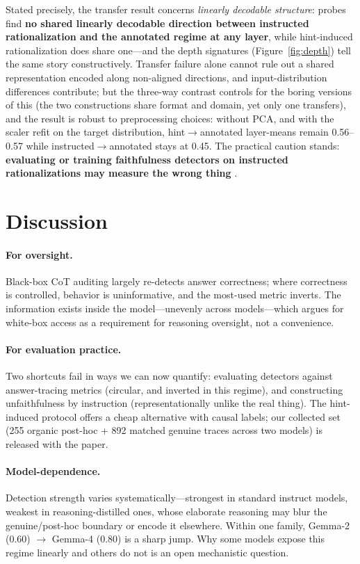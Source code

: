 \documentclass[11pt]{article}
\begin{document}
Stated precisely, the transfer result concerns \emph{linearly decodable structure}: probes find \textbf{no shared linearly decodable direction between instructed rationalization and the annotated regime at any layer}, while hint-induced rationalization does share one---and the depth signatures (Figure~\ref{fig:depth}) tell the same story constructively. Transfer failure alone cannot rule out a shared representation encoded along non-aligned directions, and input-distribution differences contribute; but the three-way contrast controls for the boring versions of this (the two constructions share format and domain, yet only one transfers), and the result is robust to preprocessing choices: without PCA, and with the scaler refit on the target distribution, hint$\to$annotated layer-means remain 0.56--0.57 while instructed$\to$annotated stays at 0.45. The practical caution stands: \textbf{evaluating or training faithfulness detectors on instructed rationalizations may measure the wrong thing} \citep[cf.\ off-policy probe failures in deception detection;][]{offpolicy2025probes}.

\section{Discussion}

\paragraph{For oversight.} Black-box CoT auditing largely re-detects answer correctness; where correctness is controlled, behavior is uninformative, and the most-used metric inverts. The information exists inside the model---unevenly across models---which argues for white-box access as a requirement for reasoning oversight, not a convenience.

\paragraph{For evaluation practice.} Two shortcuts fail in ways we can now quantify: evaluating detectors against answer-tracing metrics (circular, and inverted in this regime), and constructing unfaithfulness by instruction (representationally unlike the real thing). The hint-induced protocol offers a cheap alternative with causal labels; our collected set (255 organic post-hoc + 892 matched genuine traces across two models) is released with the paper.

\paragraph{Model-dependence.} Detection strength varies systematically---strongest in standard instruct models, weakest in reasoning-distilled ones, whose elaborate reasoning may blur the genuine/post-hoc boundary or encode it elsewhere. Within one family, Gemma-2 (0.60) $\to$ Gemma-4 (0.80) is a sharp jump. Why some models expose this regime linearly and others do not is an open mechanistic question.
\end{document}
